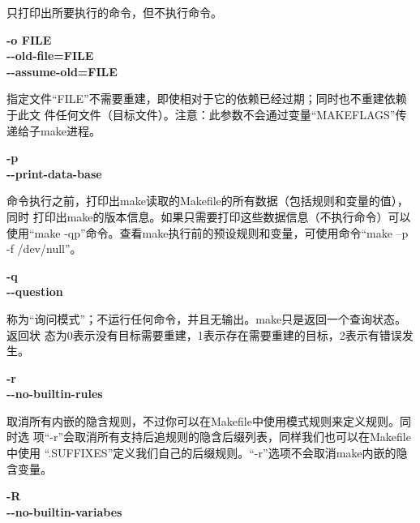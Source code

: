 \begin{dinglist}{47}
只打印出所要执行的命令，但不执行命令。

  \item \begin{minipage}[t]{\linewidth}
          \textbf{-o FILE} \\
          \textbf{-{}-old-file=FILE}\\
          \textbf{-{}-assume-old=FILE}
        \end{minipage}

指定文件“FILE”不需要重建，即使相对于它的依赖已经过期；同时也不重建依赖于此文
件任何文件（目标文件）。注意：此参数不会通过变量“MAKEFLAGS”传递给子make进程。

  \item \begin{minipage}[t]{\linewidth}
          \textbf{-p} \\
          \textbf{-{}-print-data-base}
        \end{minipage}

命令执行之前，打印出make读取的Makefile的所有数据（包括规则和变量的值），同时
打印出make的版本信息。如果只需要打印这些数据信息（不执行命令）可以使用“make
-qp”命令。查看make执行前的预设规则和变量，可使用命令“make –p -f /dev/null”。

  \item \begin{minipage}[t]{\linewidth}
          \textbf{-q} \\
          \textbf{-{}-question}
        \end{minipage}

称为“询问模式”；不运行任何命令，并且无输出。make只是返回一个查询状态。返回状
态为0表示没有目标需要重建，1表示存在需要重建的目标，2表示有错误发生。

  \item \begin{minipage}[t]{\linewidth}
          \textbf{-r} \\
          \textbf{-{}-no-builtin-rules}
        \end{minipage}

取消所有内嵌的隐含规则，不过你可以在Makefile中使用模式规则来定义规则。同时选
项“-r”会取消所有支持后追规则的隐含后缀列表，同样我们也可以在Makefile中使用
“.SUFFIXES”定义我们自己的后缀规则。“-r”选项不会取消make内嵌的隐含变量。

  \item \begin{minipage}[t]{\linewidth}
          \textbf{-R} \\
          \textbf{-{}-no-builtin-variabes}
        \end{minipage}


\end{dinglist}
